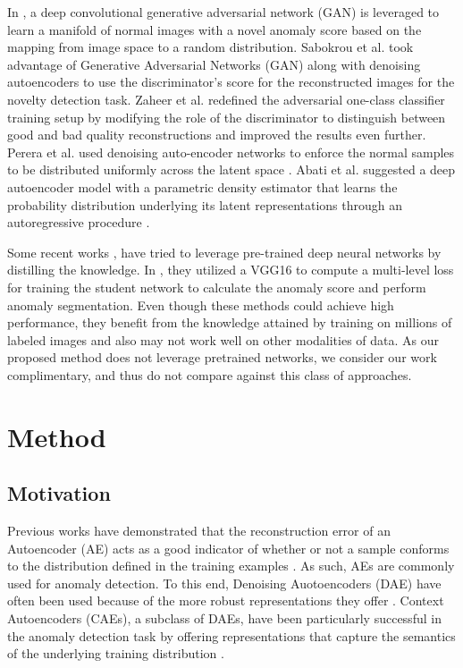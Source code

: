 \documentclass[10pt,twocolumn,letterpaper]{article}
\begin{document}
In \cite{schlegl2017unsupervised}, a deep convolutional generative adversarial network (GAN) is leveraged to learn a manifold of normal images with a novel anomaly score based on the mapping from image space to a random distribution. Sabokrou et al. \cite{sabokrou2018adversarially} took advantage of Generative Adversarial Networks (GAN) \cite{goodfellow2014generative} along with denoising autoencoders to use the discriminator’s score for the reconstructed images for the novelty detection task. Zaheer et al. \cite{zaheer2020old} redefined the adversarial one-class classifier training setup by modifying the role of the discriminator to distinguish between good and bad quality reconstructions and improved the results even further. Perera et al. used denoising auto-encoder networks to enforce the normal samples to be distributed uniformly across the latent space \cite{perera2019ocgan}. Abati et al. suggested a deep autoencoder model with a parametric density estimator that learns the probability distribution underlying its latent representations through an autoregressive procedure \cite{abati2019latent}.

Some recent works \cite{salehi2021multiresolution}, \cite{georgescu2021anomaly} have tried to leverage pre-trained deep neural networks by distilling the knowledge. In \cite{salehi2021multiresolution}, they utilized a VGG16 \cite{simonyan2014very} to compute a multi-level loss for training the student network to calculate the anomaly score and perform anomaly segmentation. Even though these methods could achieve high performance, they benefit from the knowledge attained by training on millions of labeled images and also may not work well on other modalities of data. As our proposed method does not leverage pretrained networks, we consider our work complimentary, and thus do not compare against this class of approaches. 

\section{Method}

\subsection{Motivation}

Previous works have demonstrated that the reconstruction error of an Autoencoder (AE) acts as a good indicator of whether or not a sample conforms to the distribution defined in the training examples \cite{xia2015learning}. As such, AEs are commonly used for anomaly detection. To this end, Denoising Auotoencoders (DAE) have often been used because of the more robust representations they offer \cite{alain2014regularized}. Context Autoencoders (CAEs), a subclass of DAEs, have been particularly successful in the anomaly detection task by offering representations that capture the semantics of the underlying training distribution \cite{zimmerer2018context}. 
\end{document}
